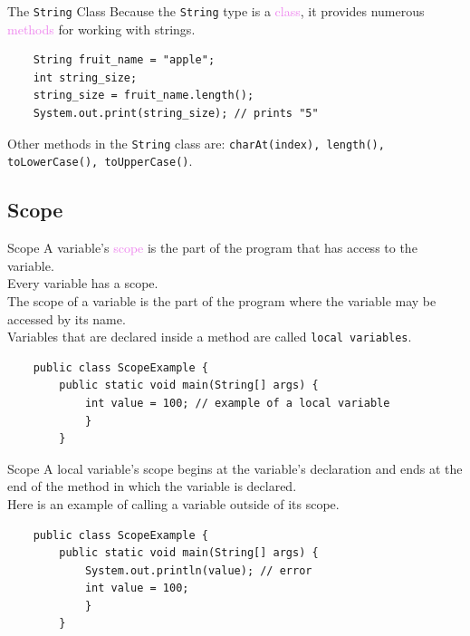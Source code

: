 \documentclass[11pt]{beamer}
\newcommand{\violet}[1]{\textcolor{violet}{#1}}
\begin{document}
\begin{frame}[fragile]{The \texttt{String} Class}
    Because the \texttt{String} type is a \violet{class}, it provides numerous \violet{methods} for working with strings.
    \begin{lstlisting}
    String fruit_name = "apple";
    int string_size;
    string_size = fruit_name.length();
    System.out.print(string_size); // prints "5"
    \end{lstlisting}
    Other methods in the \texttt{String} class are: \texttt{charAt(index), length(), toLowerCase(), toUpperCase()}.
\end{frame}

\subsection{Scope}
\begin{frame}[fragile]{Scope}
    A variable's \violet{scope} is the part of the program that has access to the variable. \\ \vspace{1em}
    Every variable has a scope. \\ \vspace{1em}
    The scope of a variable is the part of the program where the variable may be accessed by its name. \\ \vspace{1em}
    Variables that are declared inside a method are called \texttt{local variables}.
    \begin{lstlisting}
    public class ScopeExample {
        public static void main(String[] args) {
            int value = 100; // example of a local variable
            }
        }
    \end{lstlisting}
\end{frame}

\begin{frame}[fragile]{Scope}
    A local variable's scope begins at the variable's declaration and ends at the end of the method in which the variable is declared. \\ \vspace{1em}
    Here is an example of calling a variable outside of its scope.
    \begin{lstlisting}
    public class ScopeExample {
        public static void main(String[] args) {
            System.out.println(value); // error
            int value = 100;
            }
        }
    \end{lstlisting}

\end{frame}
\end{document}
